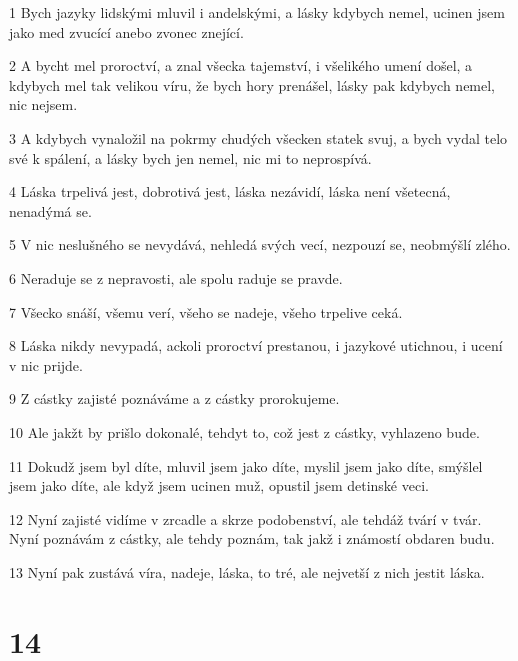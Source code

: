 \par 1 Bych jazyky lidskými mluvil i andelskými, a lásky kdybych nemel, ucinen jsem jako med zvucící anebo zvonec znející.
\par 2 A bycht mel proroctví, a znal všecka tajemství, i všelikého umení došel, a kdybych mel tak velikou víru, že bych hory prenášel, lásky pak kdybych nemel, nic nejsem.
\par 3 A kdybych vynaložil na pokrmy chudých všecken statek svuj, a bych vydal telo své k spálení, a lásky bych jen nemel, nic mi to neprospívá.
\par 4 Láska trpelivá jest, dobrotivá jest, láska nezávidí, láska není všetecná, nenadýmá se.
\par 5 V nic neslušného se nevydává, nehledá svých vecí, nezpouzí se, neobmýšlí zlého.
\par 6 Neraduje se z nepravosti, ale spolu raduje se pravde.
\par 7 Všecko snáší, všemu verí, všeho se nadeje, všeho trpelive ceká.
\par 8 Láska nikdy nevypadá, ackoli proroctví prestanou, i jazykové utichnou, i ucení v nic prijde.
\par 9 Z cástky zajisté poznáváme a z cástky prorokujeme.
\par 10 Ale jakžt by prišlo dokonalé, tehdyt to, což jest z cástky, vyhlazeno bude.
\par 11 Dokudž jsem byl díte, mluvil jsem jako díte, myslil jsem jako díte, smýšlel jsem jako díte, ale když jsem ucinen muž, opustil jsem detinské veci.
\par 12 Nyní zajisté vidíme v zrcadle a skrze podobenství, ale tehdáž tvárí v tvár. Nyní poznávám z cástky, ale tehdy poznám, tak jakž i známostí obdaren budu.
\par 13 Nyní pak zustává víra, nadeje, láska, to tré, ale nejvetší z nich jestit láska.

\chapter{14}

